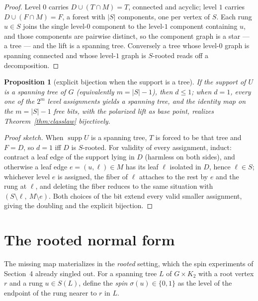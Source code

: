 \documentclass[11pt]{amsart}
\newtheorem{proposition}[theorem]{Proposition}
\theoremstyle{definition}
\begin{document}
\begin{proof}
Level $0$ carries $D \cup (T\cap M) = T$, connected and acyclic; level $1$
carries $D \cup (F \cap M) = F$, a forest with $|S|$ components, one per
vertex of $S$. Each rung $u \in S$ joins the single level-$0$ component to
the level-$1$ component containing $u$, and those components are pairwise
distinct, so the component graph is a star --- a tree --- and the lift is a
spanning tree. Conversely a tree whose level-$0$ graph is spanning
connected and whose level-$1$ graph is $S$-rooted reads off a
decomposition.
\end{proof}

\begin{proposition}[explicit bijection when the support is a tree]
\label{prop:rzero}
If the support of $U$ is a spanning tree of $G$ (equivalently $m = |S|-1$),
then $d \le 1$; when $d = 1$, \emph{every} one of the $2^m$ level
assignments yields a spanning tree, and the identity map on the $m = |S|-1$
free bits, with the polarized lift as base point, realizes
Theorem~\ref{thm:classlaw} bijectively.
\end{proposition}

\begin{proof}[Proof sketch]
When $\operatorname{supp} U$ is a spanning tree, $T$ is forced to be that
tree and $F = D$, so $d = 1$ iff $D$ is $S$-rooted. For validity of every
assignment, induct: contract a leaf edge of the support lying in $D$
(harmless on both sides), and otherwise a leaf edge $e = (u,\ell) \in M$
has its leaf $\ell$ isolated in $D$, hence $\ell \in S$; whichever level
$e$ is assigned, the fiber of $\ell$ attaches to the rest by $e$ and the
rung at $\ell$, and deleting the fiber reduces to the same situation with
$(S\setminus \ell,\ M \setminus e)$. Both choices of the bit extend every
valid smaller assignment, giving the doubling and the explicit bijection.
\end{proof}

\section{The rooted normal form}\label{sec:rooted}

The missing map materializes in the \emph{rooted} setting, which the spin
experiments of Section~4 already singled out. For a spanning tree $L$ of
$G\times K_2$ with a root vertex $r$ and a rung $u \in S(L)$, define the
\emph{spin} $\sigma(u)\in\{0,1\}$ as the level of the endpoint of the rung
nearer to $r$ in $L$.
\end{document}
